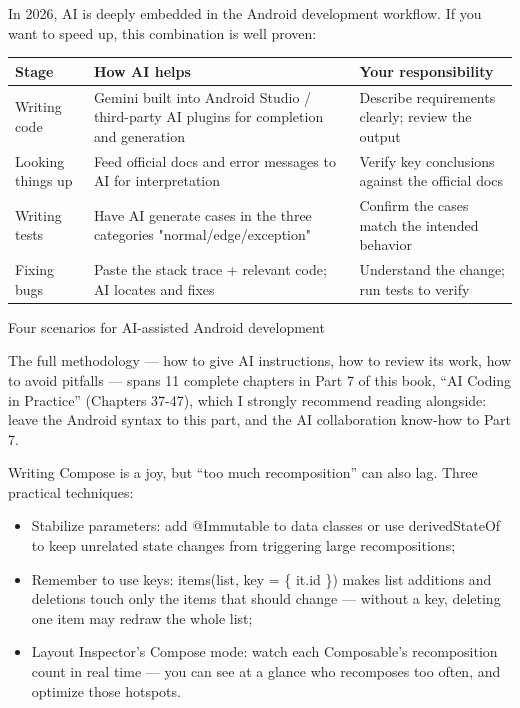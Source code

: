 
In 2026, AI is deeply embedded in the Android development workflow. If you want to speed up, this combination is well proven:

\begin{center}
\begin{tabularx}{\linewidth}{|X|X|X|}
\hline
\textbf{Stage} & \textbf{How AI helps} & \textbf{Your responsibility} \tabularnewline
\hline
Writing code & Gemini built into Android Studio / third-party AI plugins for completion and generation & Describe requirements clearly; review the output \tabularnewline
Looking things up & Feed official docs and error messages to AI for interpretation & Verify key conclusions against the official docs \tabularnewline
Writing tests & Have AI generate cases in the three categories "normal/edge/exception" & Confirm the cases match the intended behavior \tabularnewline
Fixing bugs & Paste the stack trace + relevant code; AI locates and fixes & Understand the change; run tests to verify \tabularnewline
\hline
\end{tabularx}
\end{center}

\begin{center}\small\color{gray}Four scenarios for AI-assisted Android development\end{center}

The full methodology — how to give AI instructions, how to review its work, how to avoid pitfalls — spans 11 complete chapters in Part 7 of this book, “AI Coding in Practice” (Chapters 37-47), which I strongly recommend reading alongside: leave the Android syntax to this part, and the AI collaboration know-how to Part 7.


Writing Compose is a joy, but “too much recomposition” can also lag. Three practical techniques:

\begin{itemize}
  \item Stabilize parameters: add @Immutable to data classes or use derivedStateOf to keep unrelated state changes from triggering large recompositions;
  \item Remember to use keys: items(list, key = \{ it.id \}) makes list additions and deletions touch only the items that should change — without a key, deleting one item may redraw the whole list;
  \item Layout Inspector's Compose mode: watch each Composable's recomposition count in real time — you can see at a glance who recomposes too often, and optimize those hotspots.
\end{itemize}

